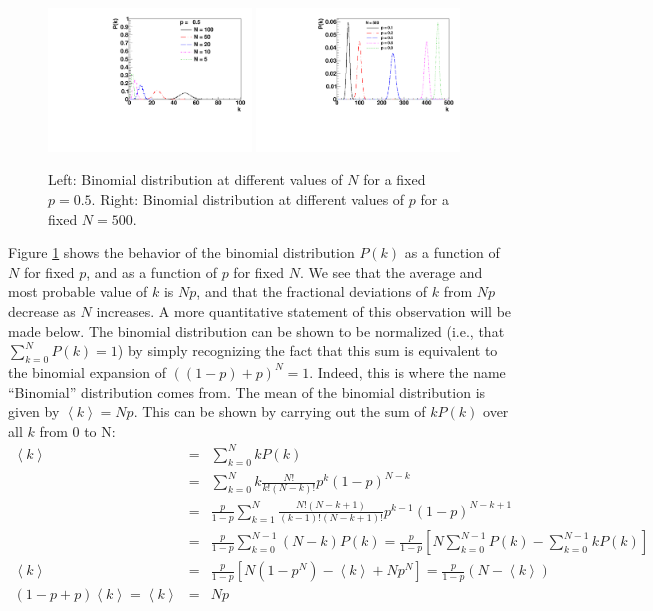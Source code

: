\documentclass{revtex4}
\begin{document}
\begin{figure}[h]
  \begin{center}
    \includegraphics[width=0.48\textwidth]{Binomial_vs_N_p50.pdf}
    \includegraphics[width=0.48\textwidth]{Binomial_vs_p_N500.pdf}
  \end{center}
  \caption{\label{fig:binomial} Left: Binomial distribution at
    different values of $N$ for a fixed $p=0.5$. Right: Binomial
    distribution at different values of $p$ for a fixed $N = 500$.}
\end{figure}
Figure \ref{fig:binomial} shows the behavior of the binomial
distribution $P(k)$ as a function of $N$ for fixed $p$, and as a
function of $p$ for fixed $N$. We see that the average and most
probable value of $k$ is $Np$, and that the fractional deviations of
$k$ from $Np$ decrease as $N$ increases. A more quantitative statement
of this observation will be made below. The binomial distribution can be shown to be normalized (i.e., that
$\sum_{k=0}^N P(k) = 1$) by simply recognizing the fact that this sum
is equivalent to the binomial expansion of $((1-p)+p)^N = 1$. Indeed,
this is where the name ``Binomial'' distribution comes from. The mean of the binomial distribution is given by $\left<k\right> =
Np$. This can be shown by carrying out the sum of $k P(k)$ over all
$k$ from 0 to N:
\begin{eqnarray}
  \left<k\right> &=& \sum_{k=0}^N k P(k) \nonumber \\
  &=& \sum_{k=0}^N k \frac{N!}{k! (N-k)!} p^k (1-p)^{N-k} \nonumber \\
  &=& \frac{p}{1-p} \sum_{k=1}^N \frac{N!(N-k+1)}{(k-1)! (N-k+1)!} p^{k-1}(1-p)^{N-k+1} \nonumber \\
  &=& \frac{p}{1-p} \sum_{k=0}^{N-1} (N-k) P(k) = \frac{p}{1-p}
  \left[N\sum_{k=0}^{N-1} P(k) - \sum_{k=0}^{N-1} k P(k)\right]
  \nonumber \\
  \left<k\right> &=& \frac{p}{1-p}\left[N(1-p^N) - \left<k\right> + N p^N \right] =
  \frac{p}{1-p}(N-\left<k\right>) \nonumber \\
  \left(1-p+p\right)\left<k\right> = \left<k\right> &=& Np \label{binomial_mean}
\end{eqnarray}
\end{document}
